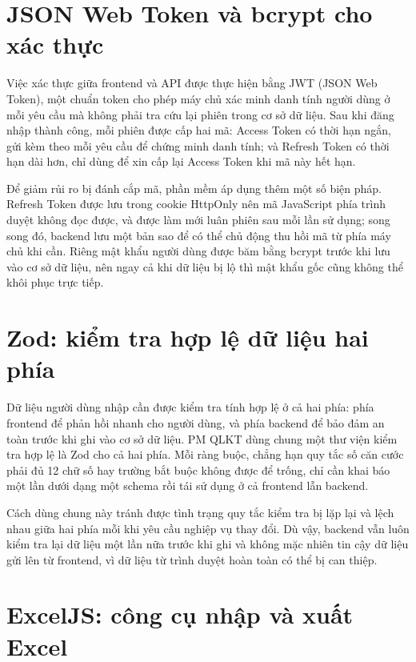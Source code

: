 \documentclass[../DoAn.tex]{subfiles}
\begin{document}
\section{JSON Web Token và bcrypt cho xác thực}
\label{section:3.6}

Việc xác thực giữa frontend và API được thực hiện bằng JWT (JSON Web Token), một chuẩn token cho phép máy chủ xác minh danh tính người dùng ở mỗi yêu cầu mà không phải tra cứu lại phiên trong cơ sở dữ liệu. Sau khi đăng nhập thành công, mỗi phiên được cấp hai mã: Access Token có thời hạn ngắn, gửi kèm theo mỗi yêu cầu để chứng minh danh tính; và Refresh Token có thời hạn dài hơn, chỉ dùng để xin cấp lại Access Token khi mã này hết hạn.

Để giảm rủi ro bị đánh cắp mã, phần mềm áp dụng thêm một số biện pháp. Refresh Token được lưu trong cookie HttpOnly nên mã JavaScript phía trình duyệt không đọc được, và được làm mới luân phiên sau mỗi lần sử dụng; song song đó, backend lưu một bản sao để có thể chủ động thu hồi mã từ phía máy chủ khi cần. Riêng mật khẩu người dùng được băm bằng bcrypt trước khi lưu vào cơ sở dữ liệu, nên ngay cả khi dữ liệu bị lộ thì mật khẩu gốc cũng không thể khôi phục trực tiếp.

\section{Zod: kiểm tra hợp lệ dữ liệu hai phía}
\label{section:3.7}

Dữ liệu người dùng nhập cần được kiểm tra tính hợp lệ ở cả hai phía: phía frontend để phản hồi nhanh cho người dùng, và phía backend để bảo đảm an toàn trước khi ghi vào cơ sở dữ liệu. PM QLKT dùng chung một thư viện kiểm tra hợp lệ là Zod \cite{zod} cho cả hai phía. Mỗi ràng buộc, chẳng hạn quy tắc số căn cước phải đủ 12 chữ số hay trường bắt buộc không được để trống, chỉ cần khai báo một lần dưới dạng một schema rồi tái sử dụng ở cả frontend lẫn backend.

Cách dùng chung này tránh được tình trạng quy tắc kiểm tra bị lặp lại và lệch nhau giữa hai phía mỗi khi yêu cầu nghiệp vụ thay đổi. Dù vậy, backend vẫn luôn kiểm tra lại dữ liệu một lần nữa trước khi ghi và không mặc nhiên tin cậy dữ liệu gửi lên từ frontend, vì dữ liệu từ trình duyệt hoàn toàn có thể bị can thiệp.

\section{ExcelJS: công cụ nhập và xuất Excel}
\label{section:3.8}
\end{document}
